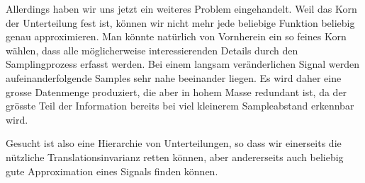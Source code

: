 Allerdings haben wir uns jetzt ein weiteres Problem eingehandelt.
Weil das Korn der Unterteilung fest ist, können wir nicht mehr jede
beliebige Funktion beliebig genau approximieren.
Man könnte natürlich von Vornherein ein so feines Korn wählen, dass alle
möglicherweise interessierenden Details durch den Samplingprozess
erfasst werden.
Bei einem langsam veränderlichen Signal werden aufeinanderfolgende Samples
sehr nahe beeinander liegen.
Es wird daher eine grosse Datenmenge produziert, die aber in hohem
Masse redundant ist, da der grösste Teil der Information bereits bei
viel kleinerem Sampleabstand erkennbar wird.

Gesucht ist also eine Hierarchie von Unterteilungen, so dass wir einerseits
die nützliche Translationsinvarianz retten können, aber andererseits auch
beliebig gute Approximation eines Signals finden können.



